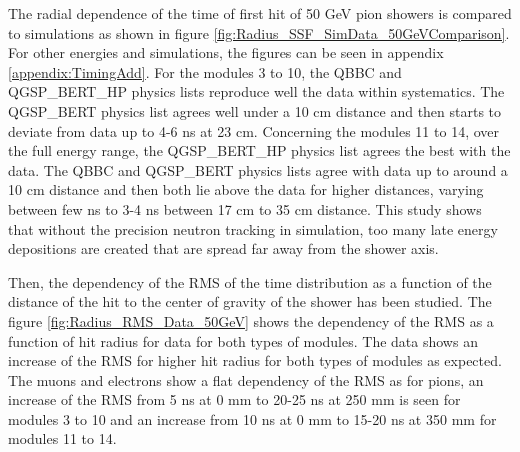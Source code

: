 The radial dependence of the time of first hit of 50 GeV pion showers is compared to simulations as shown in figure \ref{fig:Radius_SSF_SimData_50GeVComparison}. For other energies and simulations, the figures can be seen in appendix \ref{appendix:TimingAdd}. For the modules 3 to 10, the QBBC and QGSP\_BERT\_HP physics lists reproduce well the data within systematics. The QGSP\_BERT physics list agrees well under a 10 cm distance and then starts to deviate from data up to 4-6 ns at 23 cm. Concerning the modules 11 to 14, over the full energy range, the QGSP\_BERT\_HP physics list agrees the best with the data. The QBBC and QGSP\_BERT physics lists agree with data up to around a 10 cm distance and then both lie above the data for higher distances, varying between few ns to 3-4 ns between 17 cm to 35 cm distance. This study shows that without the precision neutron tracking in simulation, too many late energy depositions are created that are spread far away from the shower axis.

Then, the dependency of the RMS of the time distribution as a function of the distance of the hit to the center of gravity of the shower has been studied. The figure \ref{fig:Radius_RMS_Data_50GeV} shows the dependency of the RMS as a function of hit radius for data for both types of modules. The data shows an increase of the RMS for higher hit radius for both types of modules as expected. The muons and electrons show a flat dependency of the RMS as for pions, an increase of the RMS from 5 ns at 0 mm to 20-25 ns at 250 mm is seen for modules 3 to 10 and an increase from 10 ns at 0 mm to 15-20 ns at 350 mm for modules 11 to 14.

